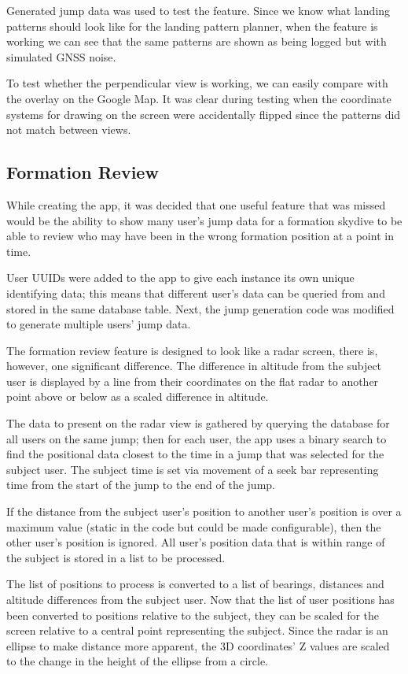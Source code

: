 Generated jump data was used to test the feature. Since we know what landing patterns should look like for the landing pattern planner, when the feature is working we can see that the same patterns are shown as being logged but with simulated GNSS noise.

To test whether the perpendicular view is working, we can easily compare with the overlay on the Google Map. It was clear during testing when the coordinate systems for drawing on the screen were accidentally flipped since the patterns did not match between views.

\subsection{Formation Review}\label{subsec:formation-review}
While creating the app, it was decided that one useful feature that was missed would be the ability to show many user's jump data for a formation skydive to be able to review who may have been in the wrong formation position at a point in time.

User UUIDs were added to the app to give each instance its own unique identifying data; this means that different user's data can be queried from and stored in the same database table. Next, the jump generation code was modified to generate multiple users' jump data.

The formation review feature is designed to look like a radar screen, there is, however, one significant difference. The difference in altitude from the subject user is displayed by a line from their coordinates on the flat radar to another point above or below as a scaled difference in altitude.

The data to present on the radar view is gathered by querying the database for all users on the same jump; then for each user, the app uses a binary search to find the positional data closest to the time in a jump that was selected for the subject user. The subject time is set via movement of a seek bar representing time from the start of the jump to the end of the jump.

If the distance from the subject user's position to another user's position is over a maximum value (static in the code but could be made configurable), then the other user's position is ignored. All user's position data that is within range of the subject is stored in a list to be processed.

The list of positions to process is converted to a list of bearings, distances and altitude differences from the subject user. Now that the list of user positions has been converted to positions relative to the subject, they can be scaled for the screen relative to a central point representing the subject. Since the radar is an ellipse to make distance more apparent, the 3D coordinates' Z values are scaled to the change in the height of the ellipse from a circle.

